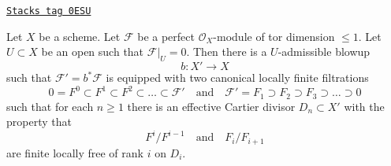 \begin{lemma}
\label{flat-lemma-canonical-blowup-torsion-pd1}
\href{https://stacks.math.columbia.edu/tag/0ESU}{\texttt{Stacks tag 0ESU}}

Let $X$ be a scheme. Let $\mathcal{F}$ be a perfect $\mathcal{O}_X$-module
of tor dimension $\leq 1$. Let $U \subset X$ be an open such that
$\mathcal{F}|_U = 0$. Then there is a $U$-admissible blowup
$$
b : X' \to X
$$
such that $\mathcal{F}' = b^*\mathcal{F}$ is equipped with two canonical
locally finite filtrations
$$
0 = F^0 \subset F^1 \subset F^2 \subset \ldots \subset \mathcal{F}'
\quad\text{and}\quad
\mathcal{F}' = F_1 \supset F_2 \supset F_3 \supset \ldots \supset 0
$$
such that for each $n \geq 1$ there is an effective Cartier divisor
$D_n \subset X'$ with the property that
$$
F^i/F^{i - 1}
\quad\text{and}\quad
F_i/F_{i + 1}
$$
are finite locally free of rank $i$ on $D_i$.
\end{lemma}

